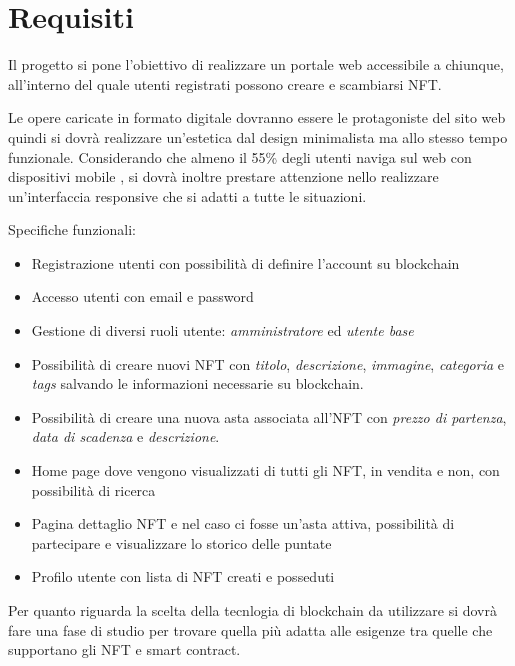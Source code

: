 \section{Requisiti}
Il progetto si pone l'obiettivo di realizzare un portale web accessibile a chiunque, 
all'interno del quale utenti registrati possono creare e scambiarsi NFT.

Le opere caricate in formato digitale dovranno essere le protagoniste del sito web
quindi si dovrà realizzare un'estetica dal design minimalista ma allo stesso tempo funzionale.
Considerando che almeno il 55\% degli utenti naviga sul web con dispositivi mobile \cite{require1}, 
si dovrà inoltre prestare attenzione nello realizzare un'interfaccia responsive che si adatti a tutte le situazioni. 

Specifiche funzionali:
\begin{itemize}
	\item Registrazione utenti con possibilità di definire l'account su blockchain
	\item Accesso utenti con email e password
	\item Gestione di diversi ruoli utente: \textit{amministratore} ed \textit{utente base}
	\item Possibilità di creare nuovi NFT con \textit{titolo}, \textit{descrizione}, \textit{immagine}, \textit{categoria} e \textit{tags} salvando le informazioni necessarie su blockchain.
	\item Possibilità di creare una nuova asta associata all'NFT con \textit{prezzo di partenza}, \textit{data di scadenza} e \textit{descrizione}.
	\item Home page dove vengono visualizzati di tutti gli NFT, in vendita e non, con possibilità di ricerca
	\item Pagina dettaglio NFT e nel caso ci fosse un'asta attiva, possibilità di partecipare e visualizzare lo storico delle puntate 
	\item Profilo utente con lista di NFT creati e posseduti
\end{itemize}

Per quanto riguarda la scelta della tecnlogia di blockchain da utilizzare 
si dovrà fare una fase di studio per trovare quella più adatta alle esigenze 
tra quelle che supportano gli NFT e smart contract. 
